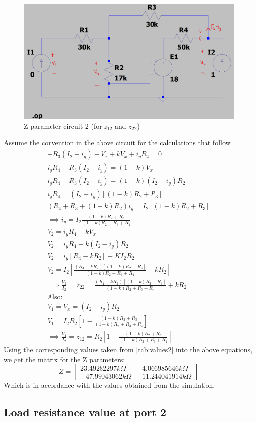 \documentclass{article}[12pt]
\begin{document}
\begin{figure}[ht]
    \centering
    \includegraphics[scale=0.25]{zparams2.png}
    \caption{Z parameter circuit 2 (for $z_{12}$ and $z_{22}$)}
\end{figure}
Assume the convention in the above circuit for the calculations that follow
\begin{gather*}
    -R_3(I_2-i_y)-V_x+kV_x+i_yR_4=0\\
    i_yR_4-R_3(I_2-i_y)=(1-k)V_x\\
    i_yR_4-R_3(I_2-i_y)=(1-k)(I_2-i_y)R_2\\
    i_yR_4=(I_2-i_y)[(1-k)R_2+R_3]\\
    (R_4+R_3+(1-k)R_2)i_y=I_2[(1-k)R_2+R_3]\\
    \implies i_y=I_2\frac{(1-k)R_2+R_3}{(1-k)R_2+R_3+R_4}\\
    V_2=i_yR_4+kV_x\\
    V_2=i_yR_4+k(I_2-i_y)R_2\\
    V_2=i_y[R_4-kR_2]+KI_2R_2\\
    V_2=I_2\left[\frac{(R_4-kR_2)[(1-k)R_2+R_3]}{(1-k)R_2+R_3+R_4}+kR_2\right]\\
    \implies \frac{V_2}{I_2} = \boxed{z_{22} = \frac{(R_4-kR_2)[(1-k)R_2+R_3]}{(1-k)R_2+R_3+R_4}+kR_2}\\
    \mathrm{Also:} \\
    V_1=V_x=(I_2-i_y)R_2\\
    V_1=I_2R_2\left[1-\frac{(1-k)R_2+R_3}{(1-k)R_2+R_3+R_4}\right]\\
    \implies \frac{V_1}{I_2} = \boxed{z_{12} = R_2\left[1-\frac{(1-k)R_2+R_3}{(1-k)R_2+R_3+R_4}\right]}
\end{gather*}
\newpage
Using the corresponding values taken from \hyperref[tab:values2]{\ref{tab:values2}} into the above equations, we get the matrix for the Z parameters:
$$ Z = \begin{bmatrix}
        23.49282297k\Omega  & -4.066985646k\Omega  \\
        -47.99043062k\Omega & -11.244041914k\Omega
    \end{bmatrix}
$$
Which is in accordance with the values obtained from the simulation.
\subsection*{Load resistance value at port 2}
\end{document}
